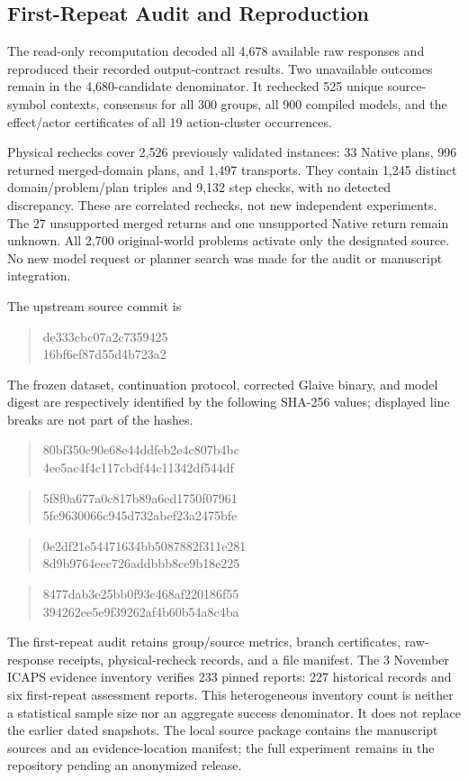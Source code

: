 \subsection{First-Repeat Audit and Reproduction}
The read-only recomputation decoded all 4,678 available raw responses and reproduced their recorded output-contract results. Two unavailable outcomes remain in the 4,680-candidate denominator. It rechecked 525 unique source-symbol contexts, consensus for all 300 groups, all 900 compiled models, and the effect/actor certificates of all 19 action-cluster occurrences.

Physical rechecks cover 2,526 previously validated instances: 33 Native plans, 996 returned merged-domain plans, and 1,497 transports. They contain 1,245 distinct domain/problem/plan triples and 9,132 step checks, with no detected discrepancy. These are correlated rechecks, not new independent experiments. The 27 unsupported merged returns and one unsupported Native return remain unknown. All 2,700 original-world problems activate only the designated source. No new model request or planner search was made for the audit or manuscript integration.

The upstream source commit is
\begin{quote}\ttfamily
de333cbc07a2c7359425\\
16bf6ef87d55d4b723a2
\end{quote}
The frozen dataset, continuation protocol, corrected Glaive binary, and model digest are respectively identified by the following SHA-256 values; displayed line breaks are not part of the hashes.
\begin{quote}\ttfamily
80bf350c90e68e44ddfeb2e4c807b4bc\\
4ee5ac4f4c117cbdf44c11342df544df
\end{quote}
\begin{quote}\ttfamily
5f8f0a677a0c817b89a6ed1750f07961\\
5fe9630066c945d732abef23a2475bfe
\end{quote}
\begin{quote}\ttfamily
0e2df21e54471634bb5087882f311e281\\
8d9b9764eec726addbbb8ce9b18e225
\end{quote}
\begin{quote}\ttfamily
8477dab3e25bb0f93c468af220186f55\\
394262ee5e9f39262af4b60b54a8c4ba
\end{quote}

The first-repeat audit retains group/source metrics, branch certificates, raw-response receipts, physical-recheck records, and a file manifest. The 3 November ICAPS evidence inventory verifies 233 pinned reports: 227 historical records and six first-repeat assessment reports. This heterogeneous inventory count is neither a statistical sample size nor an aggregate success denominator. It does not replace the earlier dated snapshots. The local source package contains the manuscript sources and an evidence-location manifest; the full experiment remains in the repository pending an anonymized release.
